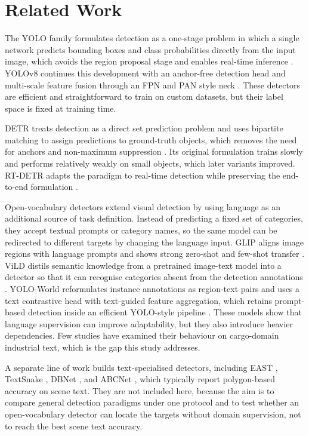 \documentclass[conference]{IEEEtran}
\begin{document}
\section{Related Work}

The YOLO family formulates detection as a one-stage problem in which a single network predicts bounding boxes and class probabilities directly from the input image, which avoids the region proposal stage and enables real-time inference \cite{redmon2016yolo,redmon2018yolov3}. YOLOv8 continues this development with an anchor-free detection head and multi-scale feature fusion through an FPN and PAN style neck \cite{yolov8}. These detectors are efficient and straightforward to train on custom datasets, but their label space is fixed at training time.

DETR treats detection as a direct set prediction problem and uses bipartite matching to assign predictions to ground-truth objects, which removes the need for anchors and non-maximum suppression \cite{carion2020detr}. Its original formulation trains slowly and performs relatively weakly on small objects, which later variants improved. RT-DETR adapts the paradigm to real-time detection while preserving the end-to-end formulation \cite{zhao2024rtdetr}.

Open-vocabulary detectors extend visual detection by using language as an additional source of task definition. Instead of predicting a fixed set of categories, they accept textual prompts or category names, so the same model can be redirected to different targets by changing the language input. GLIP aligns image regions with language prompts and shows strong zero-shot and few-shot transfer \cite{li2022glip}. ViLD distils semantic knowledge from a pretrained image-text model into a detector so that it can recognise categories absent from the detection annotations \cite{gu2022vild}. YOLO-World reformulates instance annotations as region-text pairs and uses a text contrastive head with text-guided feature aggregation, which retains prompt-based detection inside an efficient YOLO-style pipeline \cite{cheng2024yoloworld}. These models show that language supervision can improve adaptability, but they also introduce heavier dependencies. Few studies have examined their behaviour on cargo-domain industrial text, which is the gap this study addresses.

A separate line of work builds text-specialised detectors, including EAST \cite{zhou2017east}, TextSnake \cite{long2018textsnake}, DBNet \cite{liao2020dbnet}, and ABCNet \cite{liu2020abcnet}, which typically report polygon-based accuracy on scene text. They are not included here, because the aim is to compare general detection paradigms under one protocol and to test whether an open-vocabulary detector can locate the targets without domain supervision, not to reach the best scene text accuracy.
\end{document}
